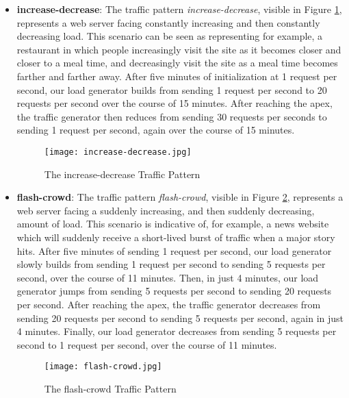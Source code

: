 \begin{itemize}
  \item \textbf{increase-decrease}: The traffic pattern
    \textit{increase-decrease}, visible in Figure \ref{fig:increase-decrease},
    represents a web server facing constantly increasing and then constantly
    decreasing load. This scenario can be seen as representing for example, a
    restaurant in which people increasingly visit the site as it becomes closer
    and closer to a meal time, and decreasingly visit the site as a meal time
    becomes farther and farther away. After five minutes of initialization at
    1 request per second, our load
    generator builds from sending 1 request per second to 20 requests per
    second over the course of 15 minutes. After reaching the apex, the traffic
    generator then reduces from sending 30 requests per seconds to sending 1
    request per second, again over the course of 15 minutes.

    \begin{figure}[!h]
      \centerline{\texttt{[image: increase-decrease.jpg]}}
      \caption{The increase-decrease Traffic Pattern}
      \label{fig:increase-decrease}
    \end{figure}

  \item \textbf{flash-crowd}: The traffic pattern \textit{flash-crowd}, visible
    in Figure \ref{fig:flash-crowd}, represents a web server facing a suddenly
    increasing, and then suddenly decreasing, amount of load. This scenario is
    indicative of, for example, a news website which will suddenly receive a
    short-lived burst of traffic when a major story hits. After five minutes of
    sending 1 request per second, our load generator
    slowly builds from sending 1 request per second
    to sending 5 requests per second, over the course of 11 minutes. Then, in
    just 4 minutes, our load generator jumps from sending 5 requests per second
    to sending 20 requests per second. After reaching the apex, the traffic
    generator decreases from sending 20 requests per second to sending 5
    requests per second, again in just 4 minutes. Finally, our load generator
    decreases from sending 5 requests per second to 1 request per second, over
    the course of 11 minutes.

    \begin{figure}[!h]
      \centerline{\texttt{[image: flash-crowd.jpg]}}
      \caption{The flash-crowd Traffic Pattern}
      \label{fig:flash-crowd}
    \end{figure}

\end{itemize}
